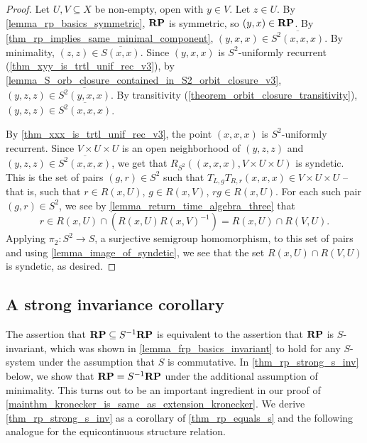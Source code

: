 \begin{proof}
\leanok{}
    Let $U, V \subseteq X$ be non-empty, open with $y \in V$.  Let $z \in U$.  By \cref{lemma_rp_basics_symmetric}, $\mathbf{RP}$ is symmetric, so $(y,x) \in \mathbf{RP}$.  By \cref{thm_rp_implies_same_minimal_component}, $(y,x,x) \in \overline{S^2 (x,x,x)}$. By minimality, $(z,z) \in \overline{S(x,x)}$.  Since $(y,x,x)$ is $S^2$-uniformly recurrent (\cref{thm_xyy_is_trtl_unif_rec_v3}), by \cref{lemma_S_orb_closure_contained_in_S2_orbit_closure_v3}, $(y,z,z) \in \overline{S^2(y,x,x)}$.  By transitivity (\cref{theorem_orbit_closure_transitivity}), $(y,z,z) \in \overline{S^2 (x,x,x)}$.
    
    By \cref{thm_xxx_is_trtl_unif_rec_v3}, the point $(x,x,x)$ is $S^2$-uniformly recurrent.  Since $V \times U \times U$ is an open neighborhood of $(y,z,z)$ and $(y,z,z) \in \overline{S^2 (x,x,x)}$, we get that $R_{S^2}((x,x,x), V \times U \times U)$ is syndetic. This is the set of pairs $(g,r) \in S^2$ such that $T_{L,g} T_{R,r} (x,x,x) \in V \times U \times U$ -- that is, such that $r \in R(x,U)$, $g \in R(x,V)$, $rg \in R(x,U)$.  For each such pair $(g,r) \in S^2$, we see by \cref{lemma_return_time_algebra_three} that
    \[r \in R(x,U) \cap (R(x,U) R(x,V)^{-1}) = R(x,U) \cap R(V,U).\]
    Applying $\pi_2: S^2 \to S$, a surjective semigroup homomorphism, to this set of pairs and using \cref{lemma_image_of_syndetic}, we see that the set $R(x,U) \cap R(V,U)$ is syndetic, as desired.
\end{proof}

\subsection{A strong invariance corollary}

The assertion that $\mathbf{RP} \subseteq S^{-1} \mathbf{RP}$
is equivalent to the assertion that $\mathbf{RP}$ is $S$-invariant, which was shown in \cref{lemma_frp_basics_invariant} to hold for any $S$-system under the assumption that $S$ is commutative.  In \cref{thm_rp_strong_s_inv} below, we show that $\mathbf{RP} = S^{-1} \mathbf{RP}$ under the additional assumption of minimality.  This turns out to be an important ingredient in our proof of \cref{mainthm_kronecker_is_same_as_extension_kronecker}.  We derive \cref{thm_rp_strong_s_inv} as a corollary of \cref{thm_rp_equals_s} and the following analogue for the equicontinuous structure relation.  

